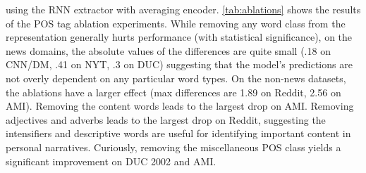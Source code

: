 using the RNN extractor with averaging encoder.
\autoref{tab:ablations} shows the results of the POS
tag ablation experiments. 
While removing any word class from the representation generally hurts %
performance (with statistical significance), on the news domains,
the absolute values of the differences are quite small 
(.18 on CNN/DM, .41 on NYT, .3 on DUC) suggesting that the model's predictions
are not overly dependent on any particular word types. 
On the non-news datasets, the ablations have a larger effect 
(max differences are 1.89 on Reddit, 2.56 on AMI). 
Removing the content words leads to the largest drop on AMI.
Removing adjectives and adverbs leads to the largest drop on Reddit,
suggesting the intensifiers and descriptive words are useful for 
identifying important content in personal narratives.
Curiously, 
removing the miscellaneous POS class yields a significant improvement
on DUC 2002 and AMI.




